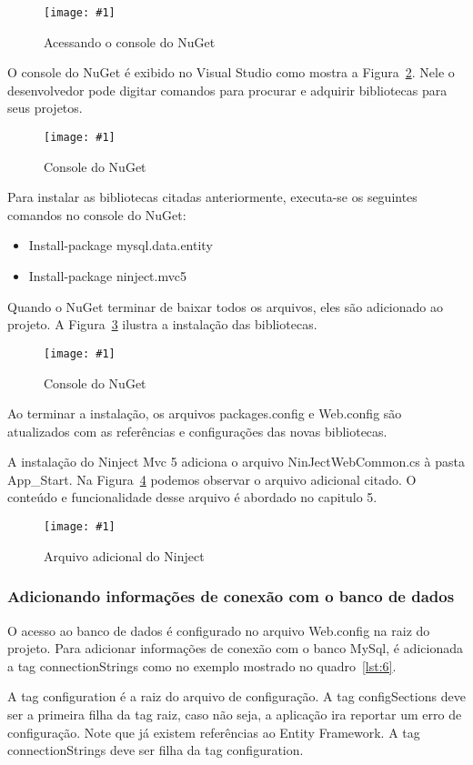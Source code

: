 \documentclass[a4paper,12pt]{article}
\newcommand{\figura}[3] {
	\begin{figure}[ht]
		\centering
		\texttt{[image: \#1]}
		\caption{#2}
		\label{#3}
	\end{figure}
	\FloatBarrier
}
\newcommand{\xmlcode}[3] {
	
	\FloatBarrier
}
\begin{document}
\figura{20.png}{Acessando o console do NuGet}{fig:20}

O console do NuGet é exibido no Visual Studio como mostra a Figura~\ref{fig:21}. Nele o desenvolvedor pode digitar comandos para procurar e adquirir bibliotecas para seus projetos.

\figura{21.png}{Console do NuGet}{fig:21}

Para instalar as bibliotecas citadas anteriormente, executa-se os seguintes comandos no console do NuGet:

\begin{itemize}
  \item Install-package mysql.data.entity
  \item Install-package ninject.mvc5
\end{itemize}

Quando o NuGet terminar de baixar todos os arquivos, eles são adicionado ao projeto. A Figura~\ref{fig:22} ilustra a instalação das bibliotecas.

\figura{22.png}{Console do NuGet}{fig:22}

Ao terminar a instalação, os arquivos packages.config e Web.config são atualizados com as referências e configurações das novas bibliotecas.

A instalação do Ninject Mvc 5 adiciona o arquivo NinJectWebCommon.cs à pasta App\_Start. Na Figura~\ref{fig:23}  podemos observar o arquivo adicional citado. O conteúdo e funcionalidade desse arquivo é abordado no capitulo 5.

\figura{23.png}{Arquivo adicional do Ninject}{fig:23}

\subsubsection{Adicionando informações de conexão com o banco de dados}

O acesso ao banco de dados é configurado no arquivo Web.config na raiz do projeto. Para adicionar informações de conexão com o banco MySql, é adicionada a tag connectionStrings como no exemplo mostrado no quadro~\ref{lst:6}.

\xmlcode{code/6.txt}{Adicionando configurações de conexão ao Web.xml}{lst:6}

A tag configuration é a raiz do arquivo de configuração. A tag configSections deve ser a primeira filha da tag raiz, caso não seja, a aplicação ira reportar um erro de configuração. Note que já existem referências ao Entity Framework. A tag connectionStrings deve ser filha da tag configuration.
\end{document}
